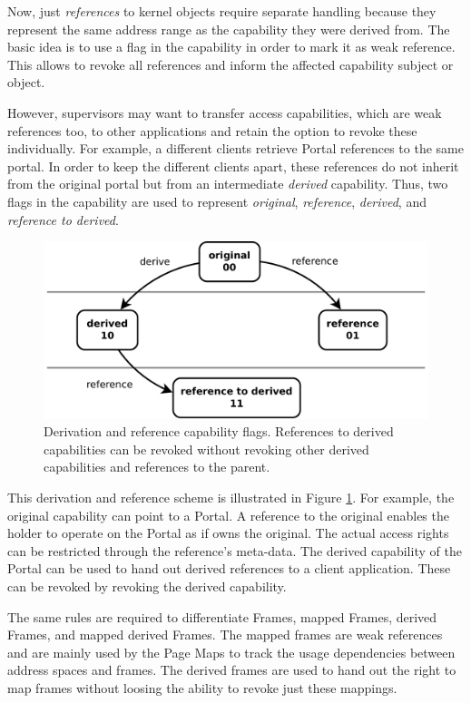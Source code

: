 Now, just \emph{references} to kernel objects require separate handling because they represent the same address range as the capability they were derived from. The basic idea is to use a flag in the capability in order to mark it as weak reference. This allows to revoke all references and inform the affected capability subject or object.

However, supervisors may want to transfer access capabilities, which are weak references too, to other applications and retain the option to revoke these individually. For example, a different clients retrieve Portal references to the same portal. In order to keep the different clients apart, these references do not inherit from the original portal but from an intermediate \emph{derived} capability. 
Thus, two flags in the capability are used to represent \emph{original}, \emph{reference}, \emph{derived}, and \emph{reference to derived}. 

\begin{figure}
  \centering
  \includegraphics[scale=0.25]{fig/DerivedReferenceBits.pdf}
  \caption{Derivation and reference capability flags. References to derived capabilities can be revoked without revoking other derived capabilities and references to the parent.}
  \label{fig:cap-types}
\end{figure}

This derivation and reference scheme is illustrated in Figure \ref{fig:cap-types}. For example, the original capability can point to a Portal. A reference to the original enables the holder to operate on the Portal as if owns the original. The actual access rights can be restricted through the reference's meta-data. The derived capability of the Portal can be used to hand out derived references to a client application. These can be revoked by revoking the derived capability.  

The same rules are required to differentiate Frames, mapped Frames, derived Frames, and mapped derived Frames. The mapped frames are weak references and are mainly used by the Page Maps to track the usage dependencies between address spaces and frames. The derived frames are used to hand out the right to map frames without loosing the ability to revoke just these mappings.

